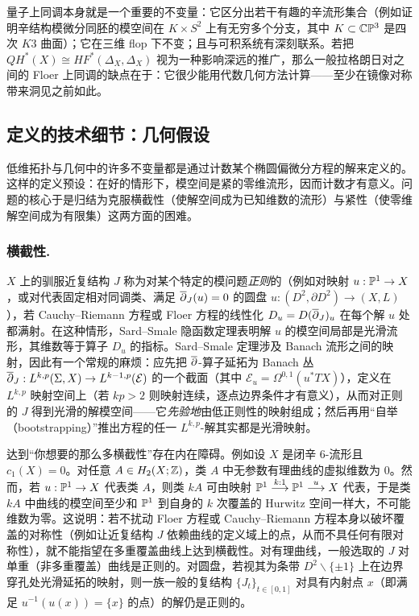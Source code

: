 量子上同调本身就是一个重要的不变量：它区分出若干有趣的辛流形集合（例如证明辛结构模微分同胚的模空间在 $K \times S^2$ 上有无穷多个分支，其中 $K \subset \mathbb{C}\mathbb{P}^3$ 是四次 $K3$ 曲面）；它在三维 flop 下不变；且与可积系统有深刻联系。若把 $QH^*(X) \cong HF^*(\Delta_X, \Delta_X)$ 视为一种影响深远的推广，那么一般拉格朗日对之间的 Floer 上同调的缺点在于：它很少能用代数几何方法计算——至少在镜像对称带来洞见之前如此。

\subsection{定义的技术细节：几何假设\label{Sec:GeometricHyp}}

低维拓扑与几何中的许多不变量都是通过计数某个椭圆偏微分方程的解来定义的。这样的定义预设：在好的情形下，模空间是紧的零维流形，因而计数才有意义。问题的核心于是归结为克服横截性（使解空间成为已知维数的流形）与紧性（使零维解空间成为有限集）这两方面的困难。

\subsubsection{横截性.} $X$ 上的驯服近复结构 $J$ 称为对某个特定的模问题\emph{正则}的（例如对映射 $u: \mathbb{P}^1 \rightarrow X$，或对代表固定相对同调类、满足 $\mathrm{\overline{\partial}}_J(u) = 0$ 的圆盘 $u: (D^2,\partial D^2) \rightarrow (X,L)$），若 Cauchy–Riemann 方程或 Floer 方程的线性化 $D_u = D(\mathrm{\overline{\partial}}_J)_u$ 在每个解 $u$ 处都满射。在这种情形，Sard–Smale 隐函数定理表明解 $u$ 的模空间局部是光滑流形，其维数等于算子 $D_u$ 的指标。Sard–Smale 定理涉及 Banach 流形之间的映射，因此有一个常规的麻烦：应先把 $\mathrm{\overline{\partial}}$-算子延拓为 Banach 丛 $\mathrm{\overline{\partial}}_J: L^{k,p}(\Sigma, X) \rightarrow L^{k-1,p}(\mathcal{E})$ 的一个截面（其中 $\mathcal{E}_u = \Omega^{0,1}(u^*TX)$），定义在 $L^{k,p}$ 映射空间上（若 $kp>2$ 则映射连续，逐点边界条件才有意义），从而对正则的 $J$ 得到光滑的解模空间——它\emph{先验地}由低正则性的映射组成；然后再用“自举（bootstrapping）”推出方程的任一 $L^{k,p}$-解其实都是光滑映射。

达到“你想要的那么多横截性”存在内在障碍。例如设 $X$ 是闭辛 6-流形且 $c_1(X) =0$。对任意 $A \in H_2(X;\mathbb{Z})$，类 $A$ 中无参数有理曲线的虚拟维数为 $0$。然而，若 $u: \mathbb{P}^1 \rightarrow X$ 代表类 $A$，则类 $kA$ 可由映射 $\mathbb{P}^1 \stackrel{k:1}{\longrightarrow} \mathbb{P}^1 \stackrel{u}{\longrightarrow} X$ 代表，于是类 $kA$ 中曲线的模空间至少和 $\mathbb{P}^1$ 到自身的 $k$ 次覆盖的 Hurwitz 空间一样大，不可能维数为零。这说明：若不扰动 Floer 方程或 Cauchy–Riemann 方程本身以破坏覆盖的对称性（例如让近复结构 $J$ 依赖曲线的定义域上的点，从而不具任何有限对称性），就不能指望在多重覆盖曲线上达到横截性。对有理曲线，一般选取的 $J$ 对单重（非多重覆盖）曲线是正则的。对圆盘，若视其为条带 $D^2 \backslash \{\pm 1\}$ 上在边界穿孔处光滑延拓的映射，则一族一般的复结构 $\{J_t\}_{t\in[0,1]}$ 对具有内射点 $x$（即满足 $u^{-1}(u(x)) = \{x\}$ 的点）的解仍是正则的。

